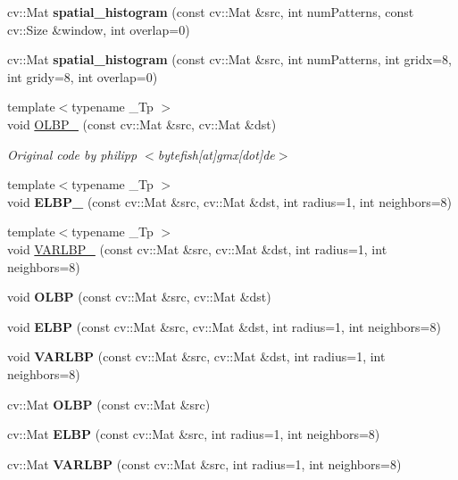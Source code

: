 \begin{DoxyCompactItemize}
\item 
\mbox{\label{namespacelbp_a969e1b4575a7bdaf68271e5855b2a3da}} 
cv\+::\+Mat {\bfseries spatial\+\_\+histogram} (const cv\+::\+Mat \&src, int num\+Patterns, const cv\+::\+Size \&window, int overlap=0)
\item 
\mbox{\label{namespacelbp_abc898ced323b22d8659c5a8a28a805b7}} 
cv\+::\+Mat {\bfseries spatial\+\_\+histogram} (const cv\+::\+Mat \&src, int num\+Patterns, int gridx=8, int gridy=8, int overlap=0)
\item 
{\footnotesize template$<$typename \+\_\+\+Tp $>$ }\\void \hyperlink{namespacelbp_a640337219aa7c2a5326fa41af8269cc5}{O\+L\+B\+P\+\_\+} (const cv\+::\+Mat \&src, cv\+::\+Mat \&dst)
\begin{DoxyCompactList}\small\item\em Original code by philipp $<$bytefish\mbox{[}at\mbox{]}gmx\mbox{[}dot\mbox{]}de$>$ \end{DoxyCompactList}\item 
\mbox{\label{namespacelbp_a0a37f5c75a252b844f2a0a53e39d4d1c}} 
{\footnotesize template$<$typename \+\_\+\+Tp $>$ }\\void {\bfseries E\+L\+B\+P\+\_\+} (const cv\+::\+Mat \&src, cv\+::\+Mat \&dst, int radius=1, int neighbors=8)
\item 
{\footnotesize template$<$typename \+\_\+\+Tp $>$ }\\void \hyperlink{namespacelbp_a32baee0ff6f7c9703bc16f1e965e7324}{V\+A\+R\+L\+B\+P\+\_\+} (const cv\+::\+Mat \&src, cv\+::\+Mat \&dst, int radius=1, int neighbors=8)
\item 
\mbox{\label{namespacelbp_aa36d3518cf5dfc2287a833598ecd2247}} 
void {\bfseries O\+L\+BP} (const cv\+::\+Mat \&src, cv\+::\+Mat \&dst)
\item 
\mbox{\label{namespacelbp_a7ca5bceb1a229bac0760c527a68e838e}} 
void {\bfseries E\+L\+BP} (const cv\+::\+Mat \&src, cv\+::\+Mat \&dst, int radius=1, int neighbors=8)
\item 
\mbox{\label{namespacelbp_a0b3e413fbb2c14f3d7e5c99370a6671d}} 
void {\bfseries V\+A\+R\+L\+BP} (const cv\+::\+Mat \&src, cv\+::\+Mat \&dst, int radius=1, int neighbors=8)
\item 
\mbox{\label{namespacelbp_a5cfe27bf479d2f8eaf4ff487ef7b6532}} 
cv\+::\+Mat {\bfseries O\+L\+BP} (const cv\+::\+Mat \&src)
\item 
\mbox{\label{namespacelbp_aeaa7fc1cf01cd9093610e6d89a7bb4a3}} 
cv\+::\+Mat {\bfseries E\+L\+BP} (const cv\+::\+Mat \&src, int radius=1, int neighbors=8)
\item 
\mbox{\label{namespacelbp_a17e665b32c7d6438478deecaa9174afc}} 
cv\+::\+Mat {\bfseries V\+A\+R\+L\+BP} (const cv\+::\+Mat \&src, int radius=1, int neighbors=8)
\end{DoxyCompactItemize}


